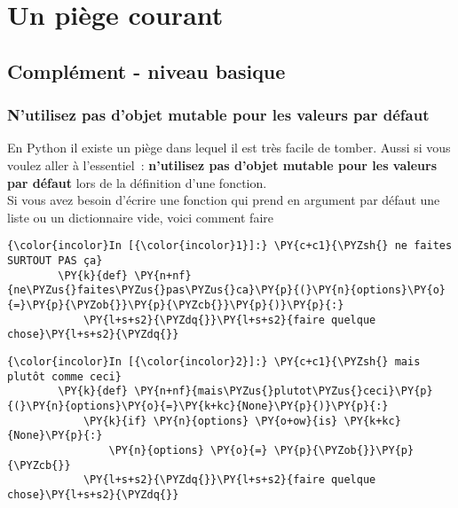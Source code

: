     \hypertarget{un-piuxe8ge-courant}{%
\section{Un piège courant}\label{un-piuxe8ge-courant}}

    \hypertarget{compluxe9ment---niveau-basique}{%
\subsection{Complément - niveau
basique}\label{compluxe9ment---niveau-basique}}

    \hypertarget{nutilisez-pas-dobjet-mutable-pour-les-valeurs-par-duxe9faut}{%
\subsubsection{N'utilisez pas d'objet mutable pour les valeurs par
défaut}\label{nutilisez-pas-dobjet-mutable-pour-les-valeurs-par-duxe9faut}}

    En Python il existe un piège dans lequel il est très facile de tomber.
Aussi si vous voulez aller à l'essentiel~: \textbf{n'utilisez pas
d'objet mutable pour les valeurs par défaut} lors de la définition d'une
fonction.\\

Si vous avez besoin d'écrire une fonction qui prend en argument par
défaut une liste ou un dictionnaire vide, voici comment faire

    \begin{Verbatim}[commandchars=\\\{\}]
{\color{incolor}In [{\color{incolor}1}]:} \PY{c+c1}{\PYZsh{} ne faites SURTOUT PAS ça}
        \PY{k}{def} \PY{n+nf}{ne\PYZus{}faites\PYZus{}pas\PYZus{}ca}\PY{p}{(}\PY{n}{options}\PY{o}{=}\PY{p}{\PYZob{}}\PY{p}{\PYZcb{}}\PY{p}{)}\PY{p}{:}
            \PY{l+s+s2}{\PYZdq{}}\PY{l+s+s2}{faire quelque chose}\PY{l+s+s2}{\PYZdq{}}
\end{Verbatim}


    \begin{Verbatim}[commandchars=\\\{\}]
{\color{incolor}In [{\color{incolor}2}]:} \PY{c+c1}{\PYZsh{} mais plutôt comme ceci}
        \PY{k}{def} \PY{n+nf}{mais\PYZus{}plutot\PYZus{}ceci}\PY{p}{(}\PY{n}{options}\PY{o}{=}\PY{k+kc}{None}\PY{p}{)}\PY{p}{:}
            \PY{k}{if} \PY{n}{options} \PY{o+ow}{is} \PY{k+kc}{None}\PY{p}{:} 
                \PY{n}{options} \PY{o}{=} \PY{p}{\PYZob{}}\PY{p}{\PYZcb{}}
            \PY{l+s+s2}{\PYZdq{}}\PY{l+s+s2}{faire quelque chose}\PY{l+s+s2}{\PYZdq{}}
\end{Verbatim}



